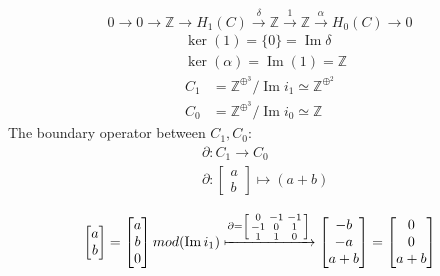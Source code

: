 \documentclass[11pt,a4paper]{report}
\DeclareMathOperator{\Ima}{Im}
\begin{document}
\begin{Ex}
                \[
                0 \rightarrow 0 \rightarrow \mathbb{Z} \rightarrow H_1(C) \xrightarrow{\delta} \mathbb{Z} \xrightarrow{1} \mathbb{Z} \xrightarrow{\alpha} H_0(C) \rightarrow 0
                \]
                \begin{align*}
                  &\ker(1) = \{0\} = \Ima \delta\\
                  &\ker(\alpha) = \Ima(1) = \mathbb{Z}
                \end{align*}
                \begin{align*}
                  C_1 &= \mathbb{Z}^{\oplus^{3}} / \Ima i_1 \simeq \mathbb{Z}^{\oplus^{2}}\\
                  C_0 &= \mathbb{Z}^{\oplus^{3}} / \Ima i_0 \simeq \mathbb{Z}
                \end{align*}
                The boundary operator between $C_1, C_0$:
                  \begin{align*}
                 &\partial: C_1 \rightarrow C_0 \\
                 &\partial: \begin{bmatrix}
                    a\\b
                  \end{bmatrix}
                  \mapsto (a+b)
                \end{align*}


                \begin{align*}
                  \begin{bmatrix}
                    a\\b
                  \end{bmatrix}
                  =
                  \begin{bmatrix}
                    a\\b\\0
                  \end{bmatrix} mod(\Ima i_1) \xmapsto{\partial = \left[\begin{smallmatrix}0&-1&-1\\-1&0&1\\1&1&0\end{smallmatrix}\right]} \begin{bmatrix}
                    -b\\-a\\a+b
                  \end{bmatrix}
                  =
                  \begin{bmatrix}
                    0\\0\\a+b
                  \end{bmatrix}
                \end{align*}


\end{Ex}
\end{document}
